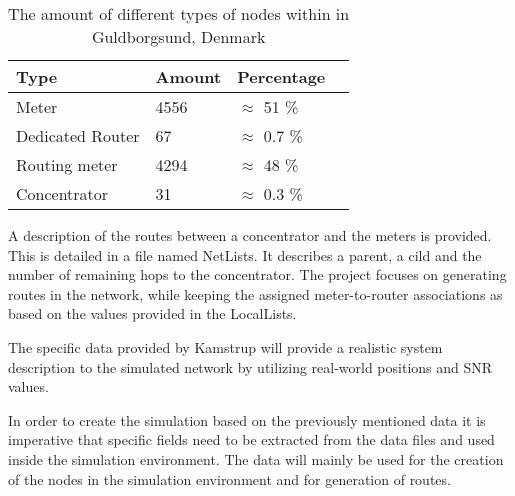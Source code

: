 \begin{table}[H]
\begin{center}
    \begin{tabular}{ | l | l | l | l |}
    \hline
    Type & Amount & Percentage \\ \hline
    Meter & 4556 & $\approx$ 51 \% \\ \hline
    Dedicated Router & 67 & $\approx$ 0.7 \% \\ \hline
    Routing meter & 4294 & $\approx$ 48 \% \\ \hline
    Concentrator & 31 & $\approx$ 0.3 \% \\
    \hline
    \end{tabular}
\end{center}
\caption{The amount of different types of nodes within in Guldborgsund, Denmark}
\label{tab:amount_of_nodes}
\end{table}


A description of the routes between a concentrator and the meters is provided. This is detailed in a file named NetLists. It describes a parent, a cild and the number of remaining hops to the concentrator. The project focuses on generating routes in the network, while keeping the assigned meter-to-router associations as based on the values provided in the LocalLists.

The specific data provided by Kamstrup will provide a realistic system description to the simulated network by utilizing real-world positions and SNR values.

In order to create the simulation based on the previously mentioned data it is imperative that specific fields need to be extracted from the data files and used inside the simulation environment. The data will mainly be used for the creation of the nodes in the simulation environment and for generation of routes. %

